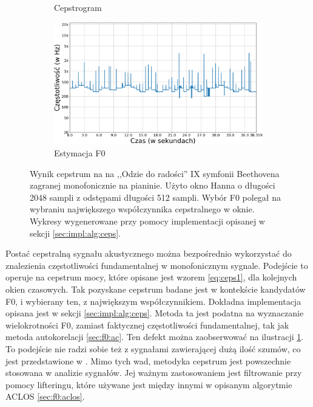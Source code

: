 \documentclass[12pt,a4paper,twoside]{mwart}
\begin{document}
\begin{figure}[t]
\begin{subfigure}{.49\textwidth}
    \caption{Cepstrogram}
  \end{subfigure}
  \begin{subfigure}{.5\textwidth}
    \centering
    \includegraphics[width=1.\linewidth]{images/Cepstrum/estymacjaF0_cropped.png}
    \caption{Estymacja F0}
  \end{subfigure}
  \caption{Wynik cepstrum na na ,,Odzie do radości'' IX symfonii Beethovena zagranej monofonicznie na pianinie. Użyto okno Hanna o długości 2048 sampli z odstępami długości 512 sampli. Wybór F0 polegał na wybraniu największego współczynnika cepstralnego w oknie. Wykresy wygenerowane przy pomocy implementacji opisanej w sekcji \ref{sec:impl:alg:ceps}.}
  \label{fig:cepstrumF0}
\end{figure}

Postać cepstralną sygnału akustycznego można bezpośrednio wykorzystać do znalezienia częstotliwości fundamentalnej w monofonicznym sygnale. Podejście to operuje na cepstrum mocy, które opisane jest wzorem \ref{eq:ceps1}, dla kolejnych okien czasowych. Tak pozyskane cepstrum badane jest w kontekście kandydatów F0, i wybierany ten, z największym współczynnikiem. Dokładna implementacja opisana jest w sekcji \ref{sec:impl:alg:ceps}. Metoda ta jest podatna na wyznaczanie wielokrotności F0, zamiast faktycznej częstotliwości fundamentalnej, tak jak metoda autokorelacji \ref{sec:f0:ac}. Ten defekt można zaobserwować na ilustracji \ref{fig:cepstrumF0}. To podejście nie radzi sobie też z sygnałami zawierającej dużą ilość szumów, co jest przedstawione w \cite[233-235]{Transcription:Kunieda:Aclos}. Mimo tych wad, metodyka cepstrum jest powszechnie stosowana w analizie sygnałów. Jej ważnym zastosowaniem jest filtrowanie przy pomocy lifteringu, które używane jest między innymi w opisanym algorytmie ACLOS \ref{sec:f0:aclos}.
\end{document}
